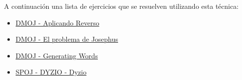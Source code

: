 A continuación una lista de ejercicios que se resuelven utilizando esta técnica:

\begin{itemize}
	\item \href{https://dmoj.uclv.edu.cu/problem/rev} {DMOJ - Aplicando Reverso} 
	\item \href{https://dmoj.uclv.edu.cu/problem/josephus} {DMOJ - El problema de Josephus}
    \item \href{https://dmoj.uclv.edu.cu/problem/genword} {DMOJ - Generating Words}
    \item \href{https://www.spoj.com/problems/DYZIO/} {SPOJ - DYZIO - Dyzio}
\end{itemize}